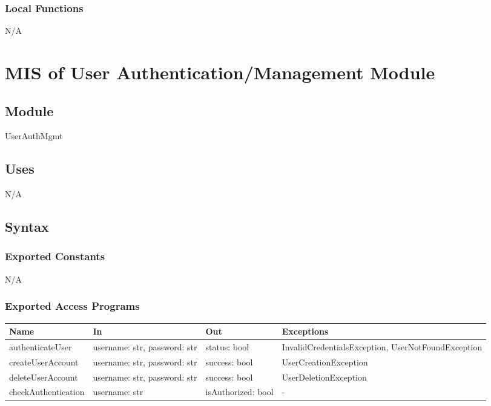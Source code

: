 \documentclass[12pt, titlepage]{article}
\begin{document}
\subsubsection{Local Functions}
N/A

\newpage

\section{MIS of User Authentication/Management Module} \label{mUserAuthMgmt}

\subsection{Module}
UserAuthMgmt

\subsection{Uses}
N/A

\subsection{Syntax}

\subsubsection{Exported Constants}
N/A

\subsubsection{Exported Access Programs}

\begin{center}
  \begin{tabular}{p{4cm} p{5cm} p{3cm} p{5cm}}
    \hline
    \textbf{Name} & \textbf{In} & \textbf{Out} & \textbf{Exceptions} \\
    \hline
    authenticateUser & username: str, password: str & status: bool &
      InvalidCredentialsException, UserNotFoundException \\
    createUserAccount & username: str, password: str & success: bool &
      UserCreationException \\
    deleteUserAccount & username: str, password: str & success: bool &
      UserDeletionException \\
    checkAuthentication & username: str & isAuthorized: bool & - \\
    \hline
  \end{tabular}
\end{center}
\end{document}
